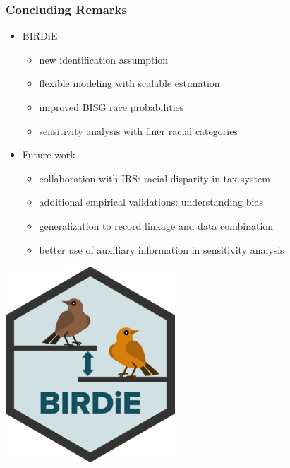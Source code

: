 \documentclass[handout]{beamer}
\begin{document}
\begin{frame}

  \frametitle{Concluding Remarks}

  \begin{itemize}
  \item BIRDiE
    \begin{itemize}
    \item new identification assumption
    \item flexible modeling with scalable estimation
    \item improved BISG race probabilities
    \item sensitivity analysis with finer racial categories
    \end{itemize}
    \vfill

  \item Future work
    \begin{itemize}
    \item collaboration with IRS: racial disparity in tax system
    \item additional empirical validations: understanding bias
    \item generalization to record linkage and data combination
    \item better use of auxiliary information in sensitivity analysis
    \end{itemize}
  \end{itemize}

  \vfill
  \vspace{-.7in}
  \begin{flushright}
     \includegraphics[scale=0.165]{../man/figures/logo.png}
  \end{flushright}
\end{frame}
\end{document}
